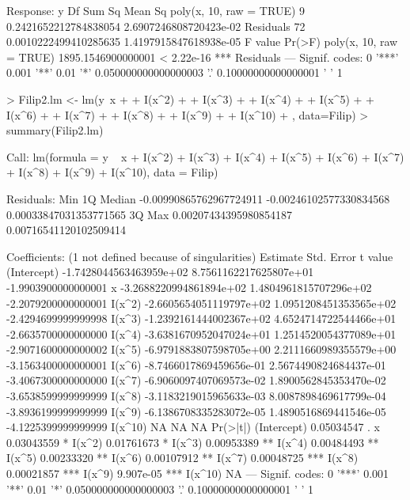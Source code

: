 \documentclass[10pt]{article}
\begin{document}
\begin{Schunk}
\begin{Soutput}
Response: y
                        Df                Sum Sq                Mean Sq
poly(x, 10, raw = TRUE)  9 0.2421652212784838054 2.6907246808720423e-02
Residuals               72 0.0010222499410285635 1.4197915847618938e-05
                                   F value     Pr(>F)    
poly(x, 10, raw = TRUE) 1895.1546900000001 < 2.22e-16 ***
Residuals                                                
---
Signif. codes:  
0 '***' 0.001 '**' 0.01 '*' 0.050000000000000003 '.' 0.10000000000000001 ' ' 1
\end{Soutput}
\end{Schunk}

\begin{Schunk}
\begin{Sinput}
> Filip2.lm <- lm(y~x + 
+                    I(x^2) +
+                    I(x^3) +
+                    I(x^4) +
+                    I(x^5) +
+                    I(x^6) +
+                    I(x^7) +
+                    I(x^8) +
+                    I(x^9) +
+                    I(x^10) 
+                 , data=Filip)
> summary(Filip2.lm)
\end{Sinput}
\begin{Soutput}
Call:
lm(formula = y ~ x + I(x^2) + I(x^3) + I(x^4) + I(x^5) + I(x^6) + 
    I(x^7) + I(x^8) + I(x^9) + I(x^10), data = Filip)

Residuals:
                    Min                      1Q                  Median 
-0.00990865762967724911 -0.00246102577330834568  0.00033847031353771565 
                     3Q                     Max 
 0.00207434395980854187  0.00716541120102509414 

Coefficients: (1 not defined because of singularities)
                           Estimate              Std. Error             t value
(Intercept) -1.7428044563463959e+02  8.7561162217625807e+01 -1.9903900000000001
x           -3.2688220994861894e+02  1.4804961815707296e+02 -2.2079200000000001
I(x^2)      -2.6605654051119797e+02  1.0951208451353565e+02 -2.4294699999999998
I(x^3)      -1.2392161444002367e+02  4.6524714722544466e+01 -2.6635700000000000
I(x^4)      -3.6381670952047024e+01  1.2514520054377089e+01 -2.9071600000000002
I(x^5)      -6.9791883807598705e+00  2.2111660989355579e+00 -3.1563400000000001
I(x^6)      -8.7466017869459656e-01  2.5674490824684437e-01 -3.4067300000000000
I(x^7)      -6.9060097407069573e-02  1.8900562845353470e-02 -3.6538599999999999
I(x^8)      -3.1183219015965633e-03  8.0087898469617799e-04 -3.8936199999999999
I(x^9)      -6.1386708335283072e-05  1.4890516869441546e-05 -4.1225399999999999
I(x^10)                          NA                      NA                  NA
              Pr(>|t|)    
(Intercept) 0.05034547 .  
x           0.03043559 *  
I(x^2)      0.01761673 *  
I(x^3)      0.00953389 ** 
I(x^4)      0.00484493 ** 
I(x^5)      0.00233320 ** 
I(x^6)      0.00107912 ** 
I(x^7)      0.00048725 ***
I(x^8)      0.00021857 ***
I(x^9)       9.907e-05 ***
I(x^10)             NA    
---
Signif. codes:  
0 '***' 0.001 '**' 0.01 '*' 0.050000000000000003 '.' 0.10000000000000001 ' ' 1


\end{Soutput}
\end{Schunk}
\end{document}

